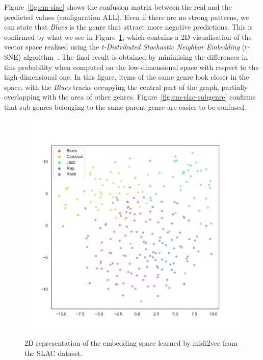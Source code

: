 \documentclass{article}
\newcommand{\figref}[1]{\mbox{Figure~\ref{#1}}}
\begin{document}
\figref{fig:cm-slac} shows the confusion matrix between the real and the predicted values (configuration ALL). Even if there are no strong patterns, we can state that \textit{Blues} is the genre that attract more negative predictions. This is confirmed by what we see in \figref{fig:tsne-slac}, which contains a 2D visualisation of the vector space realised using the \textit{t-Distributed Stochastic Neighbor Embedding} (t-SNE) algorithm~\citep{maaten2008visualizing}. The final result is obtained by minimising the differences in this probability when computed on the low-dimensional space with respect to the high-dimensional one. In this figure, items of the same genre look closer in the space, with the \textit{Blues} tracks occupying the central part of the graph, partially overlapping with the area of other genres.
\figref{fig:cm-slac-subgenre} confirms that sub-genres belonging to the same parent genre are easier to be confused.

\begin{figure}[ht]
    \centering
    \includegraphics[width=\linewidth]{figs/tsne-slac-genre.pdf}
    \caption{2D representation of the embedding space learned by midi2vec from the SLAC dataset.}
    \label{fig:tsne-slac}
\end{figure}
\end{document}
